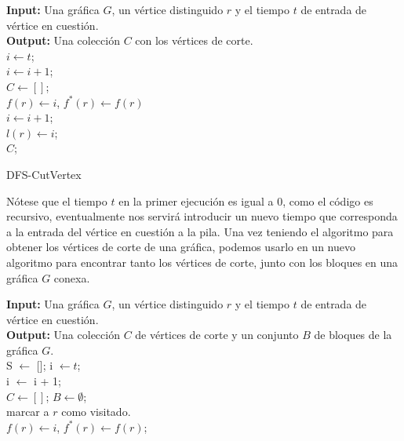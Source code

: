 \documentclass{article}
\begin{document}
\begin{enumerate}
  \begin{algorithm}[H]
    \textbf{Input: }Una gráfica $G$, un vértice distinguido $r$ y el tiempo
    $t$ de entrada de vértice en cuestión. \\
    \textbf{Output: }Una colección $C$ con los vértices de corte.\\
    $i \leftarrow t$;\\
    $i \leftarrow i+1$;\\
    $C \leftarrow []$;\\
    $f(r) \leftarrow i$, $f^{*}(r) \leftarrow f(r)$\\
    $i \leftarrow i+1$;\\
    $l(r) \leftarrow i$;\\
    \Return $C$;
    \caption{DFS-CutVertex}
  \end{algorithm}
  
  
  Nótese que el tiempo $t$ en la primer ejecución es igual a 0, como el código
  es recursivo, eventualmente nos servirá introducir un nuevo tiempo que corresponda a la entrada del vértice en cuestión a la pila. Una vez teniendo el algoritmo para obtener los vértices de corte de una gráfica, podemos usarlo en un nuevo algoritmo para encontrar tanto los vértices de corte, junto con los bloques en una gráfica $G$ conexa.\\
  
  
  \begin{algorithm}[H]
    \textbf{Input:} Una gráfica $G$, un vértice distinguido $r$ y el tiempo
    $t$ de entrada de vértice en cuestión. \\
    \textbf{Output:} Una colección $C$ de vértices de corte y un conjunto $B$ de bloques de la gráfica $G$.\\
    S $\leftarrow$ []; i $\leftarrow t$;\\
    i $\leftarrow$ i + 1;\\
    $C \leftarrow []$; $B \leftarrow \emptyset$;\\
    marcar a $r$ como visitado.\\
    $f(r) \leftarrow i$, $f^{*}(r) \leftarrow f(r)$;\\
    

\end{algorithm}
\end{enumerate}
\end{document}
